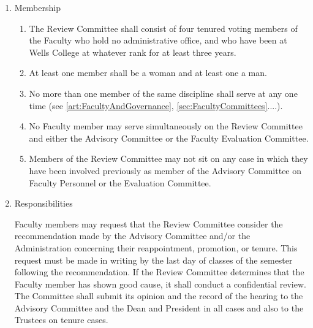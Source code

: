 \documentclass{manual}
\newcommand{\itemLevelA}{\alph*.}
\newcommand{\itemLevelB}{\arabic*)}
\newcommand{\itemRefA}{\alph*}
\newcommand{\itemRefB}{\arabic*}
\begin{document}
\begin{enumerate}[label=\itemLevelA,ref=\itemRefA]

\item Membership
\begin{enumerate}[label=\itemLevelB,ref=\itemRefB]

\item The Review Committee shall consist of four tenured voting members of the Faculty who hold no administrative office, and who have been at Wells College at whatever rank for at least three years.

\item At least one member shall be a woman and at least one a man.

\item No more than one member of the same discipline shall serve at any one time (see \cref{art:FacultyAndGovernance}, \cref{sec:FacultyCommittees}....).

\item No Faculty member may serve simultaneously on the Review Committee and either the Advisory Committee or the Faculty Evaluation Committee.

\item Members of the Review Committee may not sit on any case in which they have been involved previously as member of the Advisory Committee on Faculty Personnel or the Evaluation Committee.

\end{enumerate}

\item Responsibilities

Faculty members may request that the Review Committee consider the recommendation made by the Advisory Committee and/or the Administration concerning their reappointment, promotion, or tenure. This request must be made in writing by the last day of classes of the semester following the recommendation. If the Review Committee determines that the Faculty member has shown good cause, it shall conduct a confidential review. The Committee shall submit its opinion and the record of the hearing to the Advisory Committee and the Dean and President in all cases and also to the Trustees on tenure cases.

\begin{enumerate}[label=\itemLevelB,ref=\itemRefB]


\end{enumerate}
\end{enumerate}
\end{document}
